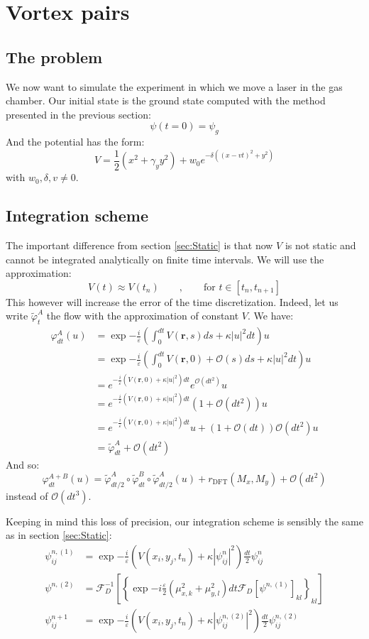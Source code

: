 \documentclass{article}
\begin{document}
\section{Vortex pairs}\label{sec:Vortex}
\subsection{The problem}
We now want to simulate the experiment in which we move a laser in the gas chamber. Our initial state is the ground state computed with the method presented in the previous section:
$$\psi(t=0)=\psi_g$$
And the potential has the form:
$$
V=\frac{1}{2}(x^2+\gamma_y y^2)+w_0 e^{-\delta\left((x-v t)^2+y^2\right)}
$$
with $w_0,\delta,v \neq 0$.

\subsection{Integration scheme}
The important difference from section \ref{sec:Static} is that now $V$ is not static and cannot be integrated analytically on finite time intervals. We will use the approximation:
$$V(t)\approx V(t_n) \qquad,\qquad \text{for  } t\in\left[t_n,t_{n+1}\right]$$
This however will increase the error of the time discretization. Indeed, let us write $\tilde{\varphi}_t^A$ the flow with the approximation of constant $V$. We have:
$$
\begin{aligned}
    \varphi^A_{dt}(u) &=\exp{-\frac{i}{\varepsilon}\left(\int_0^{dt} V(\mathbf{r},s)ds +\kappa|u|^{2}dt\right)}u\\
    &=\exp{-\frac{i}{\varepsilon}\left(\int_0^{dt} V(\mathbf{r},0)+\mathcal{O}(s)ds +\kappa|u|^{2}dt\right)}u\\
    &=e^{-\frac{i}{\varepsilon}\left(V(\mathbf{r},0) +\kappa|u|^{2}\right)dt}e^{\mathcal{O}(dt^2)}u\\
    &=e^{-\frac{i}{\varepsilon}\left(V(\mathbf{r},0) +\kappa|u|^{2}\right)dt}\left(1+\mathcal{O}(dt^2)\right)u\\
    &=e^{-\frac{i}{\varepsilon}\left(V(\mathbf{r},0) +\kappa|u|^{2}\right)dt}u+\left(1+\mathcal{O}(dt)\right)\mathcal{O}(dt^2)u\\
    &=\tilde{\varphi}_ {dt}^A+\mathcal{O}(dt^2)
\end{aligned}
$$
And so:
$$\varphi^{A+B}_{dt}(u)=\tilde{\varphi}^A_{dt/2}\circ\tilde{\varphi}^B_{dt}\circ\tilde{\varphi}^A_{dt/2}(u)+r_\text{DFT}(M_x,M_y)+\mathcal{O}(dt^2)$$
instead of $\mathcal{O}(dt^3)$.

\bigskip
Keeping in mind this loss of precision, our integration scheme is sensibly the same as in section \ref{sec:Static}:
$$
\begin{aligned}
\psi^{n,(1)}_{ij}&=\exp{-\frac{i}{\varepsilon}\left(V(x_i,y_j,t_n)+\kappa|\psi^n_{ij}|^{2}\right)\frac{dt}{2}}\psi^n_{ij}\\
\psi^{n,(2)}&=\mathcal{F}_D^{-1}\left[\left\{\exp{-i\frac{\varepsilon}{2}\left(\mu_{x,k}^2+\mu_{y,l}^2\right)dt}\mathcal{F}_D\left[\psi^{n,(1)}\right]_{kl}\right\}_{kl}\right]\\
\psi^{n+1}_{ij}&=\exp{-\frac{i}{\varepsilon}\left(V(x_i,y_j,t_n)+\kappa|\psi^{n,(2)}_{ij}|^{2}\right)\frac{dt}{2}}\psi^{n,(2)}_{ij}
\end{aligned}
$$
\end{document}

